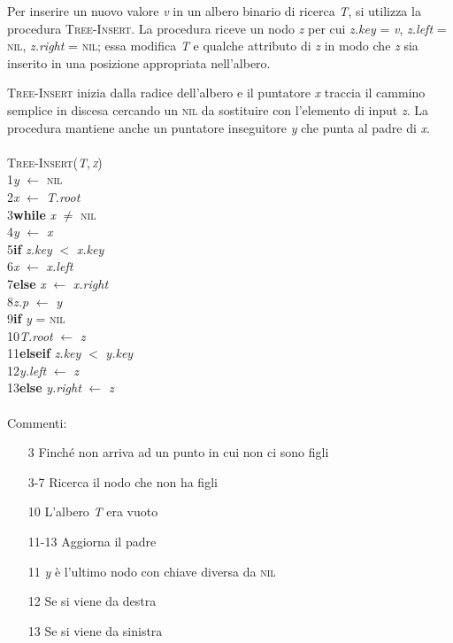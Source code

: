 \documentclass[10pt, a4paper]{report}
\newcommand\firsttab[1][0.5cm]{\hspace*{#1}}
\newcommand\secondtab[1][1cm]{\hspace*{#1}}
\newcommand\thirdtab[1][1.5cm]{\hspace*{#1}}
\begin{document}
Per inserire un nuovo valore \textit{v} in un albero binario di ricerca \textit{T}, si utilizza la procedura \textsc{Tree-Insert}. La procedura riceve un nodo \textit{z} per cui \textit{z.key} = \textit{v}, \textit{z.left} = \textsc{nil}, \textit{z.right} = \textsc{nil}; essa modifica \textit{T} e qualche attributo di \textit{z} in modo che \textit{z} sia inserito in una posizione appropriata nell'albero.

\textsc{Tree-Insert} inizia dalla radice dell'albero e il puntatore \textit{x} traccia il cammino semplice in discesa cercando un \textsc{nil} da sostituire con l'elemento di input \textit{z}. La procedura mantiene anche un puntatore inseguitore \textit{y} che punta al padre di \textit{x}.\\\\
\textsc{Tree-Insert(\textit{T},\,\textit{z})}\\
1\firsttab\textit{y} $\leftarrow$ \textsc{nil}\\
2\firsttab\textit{x} $\leftarrow$ \textit{T.root}\\
3\firsttab\textbf{while} \textit{x} $\not=$ \textsc{nil}\\ 
4\secondtab\textit{y} $\leftarrow$ \textit{x}\\
5\secondtab\textbf{if} \textit{z.key} $<$ \textit{x.key}\\
6\thirdtab\textit{x} $\leftarrow$ \textit{x.left}\\
7\secondtab\textbf{else} \textit{x} $\leftarrow$ \textit{x.right}\\
8\firsttab\textit{z.p} $\leftarrow$ \textit{y}\\
9\firsttab\textbf{if} \textit{y} = \textsc{nil}\\
10\secondtab\textit{T.root} $\leftarrow$ \textit{z}\\
11\firsttab\textbf{elseif} \textit{z.key} $<$ \textit{y.key}\\
12\secondtab\textit{y.left} $\leftarrow$ \textit{z}\\
13\firsttab\textbf{else} \textit{y.right} $\leftarrow$ \textit{z}\\\\
Commenti:
\begin{enumerate}
\item[3]Finché non arriva ad un punto in cui non ci sono figli
\item[3-7]Ricerca il nodo che non ha figli
\item[10]L'albero \textit{T} era vuoto
\item[11-13]Aggiorna il padre
\item[11]\textit{y} è l'ultimo nodo con chiave diversa da \textsc{nil}
\item[12]Se si viene da destra
\item[13]Se si viene da sinistra
\end{enumerate}
\end{document}
